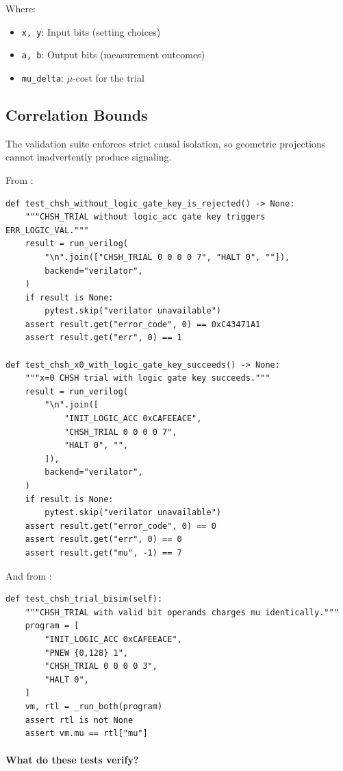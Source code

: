 Where:
\begin{itemize}
    \item \texttt{x, y}: Input bits (setting choices)
    \item \texttt{a, b}: Output bits (measurement outcomes)
    \item \texttt{mu\_delta}: $\mu$-cost for the trial
\end{itemize}

\subsection{Correlation Bounds}

The validation suite enforces strict causal isolation, so geometric projections cannot inadvertently produce signaling.

From :
\begin{lstlisting}
def test_chsh_without_logic_gate_key_is_rejected() -> None:
    """CHSH_TRIAL without logic_acc gate key triggers ERR_LOGIC_VAL."""
    result = run_verilog(
        "\n".join(["CHSH_TRIAL 0 0 0 0 7", "HALT 0", ""]),
        backend="verilator",
    )
    if result is None:
        pytest.skip("verilator unavailable")
    assert result.get("error_code", 0) == 0xC43471A1
    assert result.get("err", 0) == 1

def test_chsh_x0_with_logic_gate_key_succeeds() -> None:
    """x=0 CHSH trial with logic gate key succeeds."""
    result = run_verilog(
        "\n".join([
            "INIT_LOGIC_ACC 0xCAFEEACE",
            "CHSH_TRIAL 0 0 0 0 7",
            "HALT 0", "",
        ]),
        backend="verilator",
    )
    if result is None:
        pytest.skip("verilator unavailable")
    assert result.get("error_code", 0) == 0
    assert result.get("err", 0) == 0
    assert result.get("mu", -1) == 7
\end{lstlisting}

And from :
\begin{lstlisting}
def test_chsh_trial_bisim(self):
    """CHSH_TRIAL with valid bit operands charges mu identically."""
    program = [
        "INIT_LOGIC_ACC 0xCAFEEACE",
        "PNEW {0,128} 1",
        "CHSH_TRIAL 0 0 0 0 3",
        "HALT 0",
    ]
    vm, rtl = _run_both(program)
    assert rtl is not None
    assert vm.mu == rtl["mu"]
\end{lstlisting}

\paragraph{What do these tests verify?}

